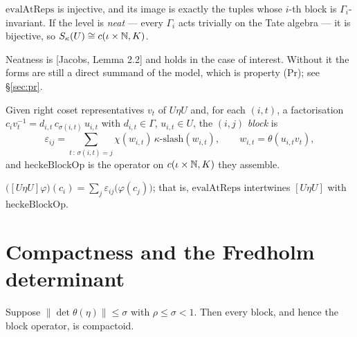 \begin{theorem}
  \label{thm:evalatreps}
  \leanok
  $\mathrm{evalAtReps}$ is injective, and its image is exactly the tuples whose $i$-th block is
  $\Gamma_i$-invariant.  If the level is \emph{neat} --- every $\Gamma_i$ acts trivially on the
  Tate algebra --- it is bijective, so $S_\kappa(U) \cong c(\iota \times \mathbb{N}, K)$.
\end{theorem}

Neatness is [Jacobs, Lemma 2.2] and holds in the case of interest.  Without it the forms are
still a direct summand of the model, which is property (Pr); see \S\ref{sec:pr}.

\begin{definition}
  \label{def:heckeblock}
  \leanok
  Given right coset representatives $v_t$ of $U\eta U$ and, for each $(i,t)$, a factorisation
  $c_i v_t^{-1} = d_{i,t}\, c_{\sigma(i,t)}\, u_{i,t}$ with $d_{i,t} \in \Gamma$, $u_{i,t} \in
  U$, the $(i,j)$ \emph{block} is
  \[
    \varepsilon_{ij} = \sum_{t \,:\, \sigma(i,t) = j} \chi(w_{i,t})\,
    \kappa\text{-}\mathrm{slash}(w_{i,t}), \qquad w_{i,t} = \theta(u_{i,t} v_t),
  \]
  and $\mathrm{heckeBlockOp}$ is the operator on $c(\iota \times \mathbb{N}, K)$ they assemble.
\end{definition}

\begin{theorem}
  \label{thm:transport}
  \leanok
  $\bigl([U\eta U]\varphi\bigr)(c_i) = \sum_j \varepsilon_{ij}\bigl(\varphi(c_j)\bigr)$; that is,
  $\mathrm{evalAtReps}$ intertwines $[U\eta U]$ with $\mathrm{heckeBlockOp}$.
\end{theorem}

\section{Compactness and the Fredholm determinant}

\begin{theorem}
  \label{thm:qmf-compact}
  \leanok
  Suppose $\lVert \det \theta(\eta) \rVert \leq \sigma$ with $\rho \leq \sigma < 1$.  Then every
  block, and hence the block operator, is compactoid.
\end{theorem}

